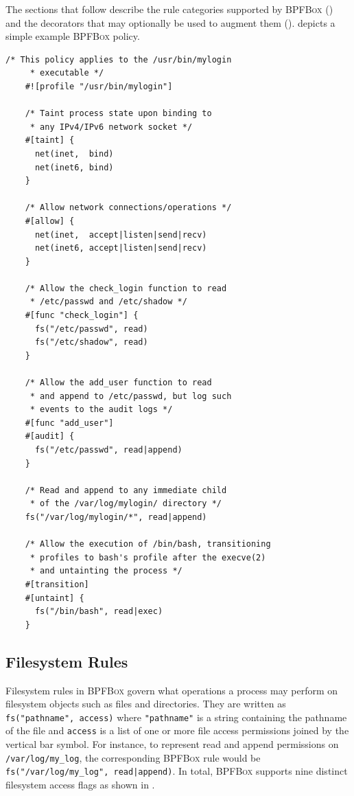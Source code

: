 \documentclass[
  fontsize=12pt,
  titlepage=firstiscover,
  paper=letter,
oneside,
  cleardoublepage=plain,
  parskip=half-,
  DIV=10,
  parindent,
  appendixprefix,
  chapterprefix,
  listof=totoc,
]{scrbook}
\newcommand{\bpfbox}{\textsc{BPFBox}}
\begin{document}
The sections that follow describe the rule categories supported by \bpfbox{}
() and the decorators that
may optionally be used to augment them ().
 depicts a simple example \bpfbox{} policy.

\begin{lstlisting}[language=bpfbox, gobble=4,
  caption={[An example \bpfbox{} policy]
    An example \bpfbox{} policy for a simple remote login program. This example offers
    a fairly complete idea of the \bpfbox{} policy language's various features.
  },
  label={lst:bpfbox-policy-example}, float]
    /* This policy applies to the /usr/bin/mylogin
     * executable */
    #![profile "/usr/bin/mylogin"]

    /* Taint process state upon binding to
     * any IPv4/IPv6 network socket */
    #[taint] {
      net(inet,  bind)
      net(inet6, bind)
    }

    /* Allow network connections/operations */
    #[allow] {
      net(inet,  accept|listen|send|recv)
      net(inet6, accept|listen|send|recv)
    }

    /* Allow the check_login function to read
     * /etc/passwd and /etc/shadow */
    #[func "check_login"] {
      fs("/etc/passwd", read)
      fs("/etc/shadow", read)
    }

    /* Allow the add_user function to read
     * and append to /etc/passwd, but log such
     * events to the audit logs */
    #[func "add_user"]
    #[audit] {
      fs("/etc/passwd", read|append)
    }

    /* Read and append to any immediate child
     * of the /var/log/mylogin/ directory */
    fs("/var/log/mylogin/*", read|append)

    /* Allow the execution of /bin/bash, transitioning
     * profiles to bash's profile after the execve(2)
     * and untainting the process */
    #[transition]
    #[untaint] {
      fs("/bin/bash", read|exec)
    }
\end{lstlisting}



\subsection{Filesystem Rules}\label{ss:bpfbox-filesystem-rules}

Filesystem rules in \bpfbox{} govern what operations a process may perform on filesystem
objects such as files and directories. They are written as
\lstinline[language=bpfbox]{fs("pathname", access)} where
\lstinline[language=bpfbox]{"pathname"} is a string containing the pathname of the file
and \lstinline[language=bpfbox]{access} is a list of one or more file access permissions
joined by the vertical bar symbol.  For instance, to represent read and
append permissions on \texttt{/var/log/my\_log}, the corresponding \bpfbox{} rule would be
\lstinline[language=bpfbox]{fs("/var/log/my_log", read|append)}.  In total, \bpfbox{}
supports nine distinct filesystem access flags as shown in .
\end{document}
